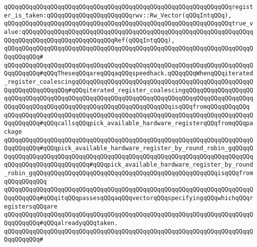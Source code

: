 \newline
\newline
\verb|qQQqqQQqqQQqqQQqqQQqqQQqqQQqqQQqqQQqqQQqqQQqqQQqqQQqqQQqqQQqqQQqregister_is_taken:qQQqqQQqqQQqqQQqqQQqqQQqrwv::Rw_Vector(qQQqIntqQQq),|\newline
\verb|qQQqqQQqqQQqqQQqqQQqqQQqqQQqqQQqqQQqqQQqqQQqqQQqqQQqqQQqqQQqqQQqtrue_value:qQQqqQQqqQQqqQQqqQQqqQQqqQQqqQQqqQQqqQQqqQQqqQQqqQQqqQQqqQQqqQQqqQQqqQQqqQQqqQQqqQQqqQQqqQQqqQQqRef(qQQqIntqQQq),|\newline
\verb|qQQqqQQqqQQqqQQqqQQqqQQqqQQqqQQqqQQqqQQqqQQqqQQqqQQqqQQqqQQqqQQqqQQqqQQqqQQqqQQq#|\newline
\verb|qQQqqQQqqQQqqQQqqQQqqQQqqQQqqQQqqQQqqQQqqQQqqQQqqQQqqQQqqQQqqQQqqQQqqQQqqQQqqQQq#qQQqTheseqQQqareqQQqaqQQqspeedhack.qQQqqQQqWhenqQQqiterated_register_coalescingqQQqqQQqqQQqqQQqqQQqqQQqqQQqqQQqqQQqqQQqqQQqqQQqqQQqqQQqqQQqqQQqqQQq#qQQqiterated_register_coalescingqQQqqQQqqQQqqQQqqQQqqQQqqQQqqQQqqQQqqQQqqQQqqQQqqQQqqQQqqQQqqQQqqQQqqQQqqQQqqQQqqQQqqQQqqQQqqQQqqQQqqQQqqQQqqQQqqQQqqQQqqQQqqQQqqQQqqQQqisqQQqfromqQQqqQQqqQQq|\newline
\verb|qQQqqQQqqQQqqQQqqQQqqQQqqQQqqQQqqQQqqQQqqQQqqQQqqQQqqQQqqQQqqQQqqQQqqQQqqQQqqQQq#qQQqcallsqQQqpick_available_hardware_registerqQQqfromqQQqpackage|\newline
\verb|qQQqqQQqqQQqqQQqqQQqqQQqqQQqqQQqqQQqqQQqqQQqqQQqqQQqqQQqqQQqqQQqqQQqqQQqqQQqqQQq#qQQqpick_available_hardware_register_by_round_robin_gqQQqqQQqqQQqqQQqqQQqqQQqqQQqqQQqqQQqqQQqqQQqqQQqqQQqqQQqqQQqqQQqqQQqqQQqqQQqqQQqqQQqqQQqqQQqqQQqqQQq#qQQqpick_available_hardware_register_by_round_robin_gqQQqqQQqqQQqqQQqqQQqqQQqqQQqqQQqqQQqqQQqqQQqqQQqqQQqisqQQqfromqQQqqQQqqQQq|\newline
\verb|qQQqqQQqqQQqqQQqqQQqqQQqqQQqqQQqqQQqqQQqqQQqqQQqqQQqqQQqqQQqqQQqqQQqqQQqqQQqqQQq#qQQqitqQQqpassesqQQqaqQQqvectorqQQqspecifyingqQQqwhichqQQqregistersqQQqare|\newline
\verb|qQQqqQQqqQQqqQQqqQQqqQQqqQQqqQQqqQQqqQQqqQQqqQQqqQQqqQQqqQQqqQQqqQQqqQQqqQQqqQQq#qQQqalreadyqQQqtaken.|\newline
\verb|qQQqqQQqqQQqqQQqqQQqqQQqqQQqqQQqqQQqqQQqqQQqqQQqqQQqqQQqqQQqqQQqqQQqqQQqqQQqqQQq#|\newline
